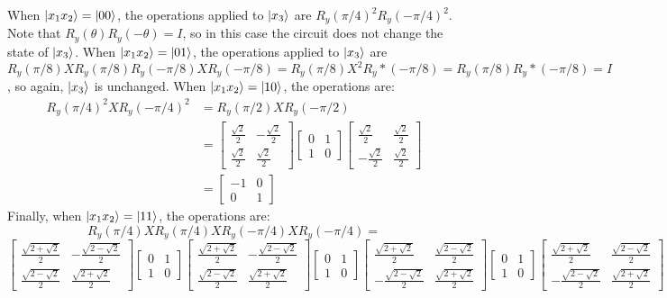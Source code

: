 When $\ket{x_1x_2}=\ket{00}$, the operations applied to $\ket{x_3}$ are $R_y(\pi/4)^2R_y(-\pi/4)^2$.  Note that $R_y(\theta)R_y(-\theta) = I$, so in this case the circuit does not change the state of $\ket{x_3}$.  When $\ket{x_1x_2} = \ket{01}$, the operations applied to $\ket{x_3}$ are $R_y(\pi/8)XR_y(\pi/8)R_y(-\pi/8)XR_y(-\pi/8)=R_y(\pi/8)X^2R_y*(-\pi/8)=R_y(\pi/8)R_y*(-\pi/8)=I$, so again, $\ket{x_3}$ is unchanged.  When $\ket{x_1x_2} = \ket{10}$, the operations are:
\begin{align*}
R_y(\pi/4)^2XR_y(-\pi/4)^2 &= R_y(\pi/2)XR_y(-\pi/2) \\
                           &= \begin{bmatrix}\frac{\sqrt{2}}{2} & - \frac{\sqrt{2}}{2} \\ \frac{\sqrt{2}}{2} &  \frac{\sqrt{2}}{2}\end{bmatrix}
                              \begin{bmatrix} 0 & 1 \\ 1 & 0 \end{bmatrix}
                              \begin{bmatrix}\frac{\sqrt{2}}{2} & \frac{\sqrt{2}}{2} \\ -\frac{\sqrt{2}}{2} &  \frac{\sqrt{2}}{2}\end{bmatrix} \\
                           &= \begin{bmatrix} -1 & 0 \\ 0 & 1\end{bmatrix}
\end{align*}
Finally, when $\ket{x_1x_2} = \ket{11}$, the operations are:
$$R_y(\pi/4)XR_y(\pi/4)XR_y(-\pi/4)XR_y(-\pi/4) = $$
$$\begin{bmatrix} \frac{\sqrt{2+\sqrt{2}}}{2} & -\frac{\sqrt{2-\sqrt{2}}}{2} \\ \frac{\sqrt{2-\sqrt{2}}}{2} & \frac{\sqrt{2+\sqrt{2}}}{2} \end{bmatrix}
\begin{bmatrix} 0 & 1 \\ 1 & 0 \end{bmatrix} 
\begin{bmatrix} \frac{\sqrt{2+\sqrt{2}}}{2} & -\frac{\sqrt{2-\sqrt{2}}}{2} \\ \frac{\sqrt{2-\sqrt{2}}}{2} & \frac{\sqrt{2+\sqrt{2}}}{2}\end{bmatrix}
\begin{bmatrix} 0 & 1 \\ 1 & 0 \end{bmatrix}
\begin{bmatrix} \frac{\sqrt{2+\sqrt{2}}}{2} & \frac{\sqrt{2-\sqrt{2}}}{2} \\ -\frac{\sqrt{2-\sqrt{2}}}{2} & \frac{\sqrt{2+\sqrt{2}}}{2}\end{bmatrix}
\begin{bmatrix} 0 & 1 \\ 1 & 0 \end{bmatrix}
\begin{bmatrix} \frac{\sqrt{2+\sqrt{2}}}{2} & \frac{\sqrt{2-\sqrt{2}}}{2} \\ -\frac{\sqrt{2-\sqrt{2}}}{2} & \frac{\sqrt{2+\sqrt{2}}}{2}\end{bmatrix} $$
